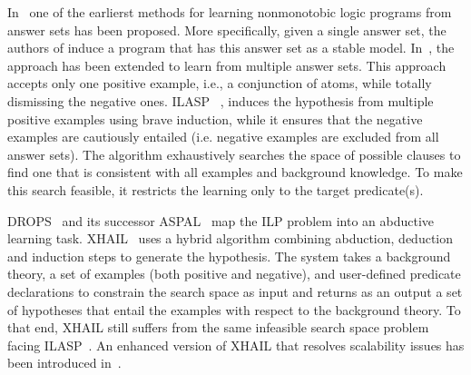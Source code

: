 
In~\cite{DBLP:journals/tocl/Sakama05} %
one of the earlierst methods for learning nonmonotobic logic programs from answer sets has been proposed. %
More specifically, given a single answer set, the authors of \cite{DBLP:journals/tocl/Sakama05} induce a program that has this answer set as a stable model. In~\cite{Sakama2009}, the approach has been extended to learn from multiple answer sets. %
This approach accepts only one positive example, i.e.,  a conjunction of atoms, while totally dismissing the negative ones. ILASP ~\cite{ILASP_system}, induces the hypothesis from multiple positive examples using brave induction, while it ensures that the negative examples are cautiously entailed (i.e. negative examples are excluded from all answer sets). The algorithm exhaustively searches the space of possible clauses to find one that is consistent with all examples and background knowledge. To make this search feasible, it restricts the learning only to the target predicate(s). 


DROPS~\cite{CorapiRL10} and its successor ASPAL~\cite{ASPAL} map the ILP problem into an abductive learning task. %
XHAIL~\cite{XHAIL} uses a hybrid algorithm combining abduction, deduction and induction steps to generate the hypothesis. The system takes a background theory, a set of examples (both positive and negative), and user-defined predicate declarations to constrain the search space as input and returns as an output a set of hypotheses that entail the examples with respect to the background theory. To that end, XHAIL still suffers from the same infeasible search space problem facing ILASP~\cite{Sakama2009}. An enhanced version of XHAIL that resolves scalability issues has been introduced in~\cite{XHAIL_extended}.




